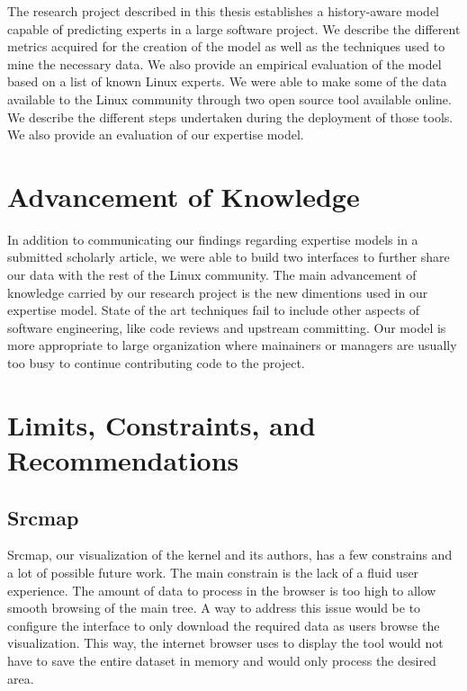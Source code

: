 \label{sec:Conclusion}


The research project described in this thesis establishes a history-aware model capable of predicting experts in a large software project. We describe the different metrics acquired for the creation of the model as well as the techniques used to mine the necessary data. We also provide an empirical evaluation of the model based on a list of known Linux experts. We were able to make some of the data available to the Linux community through two open source tool available online. We describe the different steps undertaken during the deployment of those tools. We also provide an evaluation of our expertise model.


\section{Advancement of Knowledge}


In addition to communicating our findings regarding expertise models in a submitted scholarly article, we were able to build two interfaces to further share our data with the rest of the Linux community. The main advancement of knowledge carried by our research project is the new dimentions used in our expertise model. State of the art techniques fail to include other aspects of software engineering, like code reviews and upstream committing. Our model is more appropriate to large organization where mainainers or managers are usually too busy to continue contributing code to the project. 

\section{Limits, Constraints, and Recommendations}
\label{sec:Limits and constraints}



\subsection{Srcmap}

Srcmap, our visualization of the kernel and its authors, has a few constrains and a lot of possible future work. The main constrain is the lack of a fluid user experience. The amount of data to process in the browser is too high to allow smooth browsing of the main tree. A way to address this issue would be to configure the interface to only download the required data as users browse the visualization. This way, the internet browser uses to display the tool would not have to save the entire dataset in memory and would only process the desired area. 




